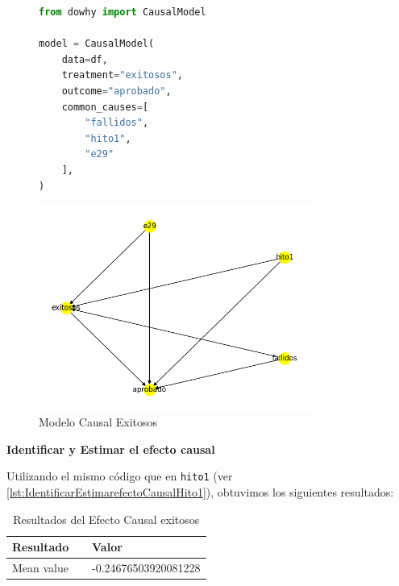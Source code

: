 \begin{figure}[H]
    \centering
    \begin{minipage}{0.48\textwidth}
        \begin{lstlisting}[language=Python, caption=Modelo causal exitosos, label=lst:model_causalExitosos]
from dowhy import CausalModel

model = CausalModel(
    data=df,
    treatment="exitosos",
    outcome="aprobado",
    common_causes=[
        "fallidos",
        "hito1",
        "e29"
    ],
)
        \end{lstlisting}
    \end{minipage}
    \hfill
    \begin{minipage}{0.48\textwidth}
        \centering
        \includegraphics[width=0.8\textwidth]{img/causalidad/graph_causal_model_exitosos.png}
        \caption{Modelo Causal Exitosos}
        \label{fig:modelo_causal_exitosos}
    \end{minipage}
\end{figure}

\textbf{Identificar y Estimar el efecto causal}

Utilizando el mismo código que en \texttt{hito1} (ver \ref{lst:IdentificarEstimarefectoCausalHito1}), obtuvimos los siguientes resultados:

\begin{table}[H]
    \centering        
    \begin{tabular}{lp{0.6\linewidth}}
        \toprule
        \textbf{Resultado} & \textbf{Valor} \\
        \midrule
        Mean value & -0.24676503920081228 \\
        \bottomrule
    \end{tabular}
    \caption{Resultados del Efecto Causal exitosos}
    \label{tab:efecto_causal_exitosos}
\end{table}

